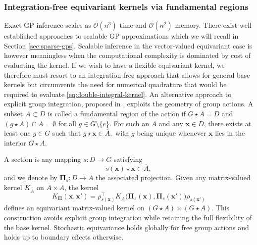 \documentclass[11pt,a4paper]{article}
\newcommand{\PiA}{\boldsymbol{\Pi}_s}
\newcommand{\Kpi}{K_{\boldsymbol{\Pi}}}
\newcommand{\sectionmap}{s}
\newcommand{\KA}{K_{\overline{A}}}
\begin{document}
\subsubsection{Integration-free equivariant kernels via fundamental regions}
Exact GP inference scales as $\mathcal{O}(n^3)$ time and $\mathcal{O}(n^2)$ memory. There exist well established approaches to scalable GP approximations which we will recall in Section \ref{sec:sparse-gps}. Scalable inference in the vector-valued equivariant case is however meaningless when the computational complexity is dominated by cost of evaluating the kernel. If we wish to have a flexible equivariant kernel, we therefore must resort to an integration-free approach that allows for general base kernels but circumvents the need for numerical quadrature that would be required to evaluate \eqref{eq:double-integral-kernel}. An alternative approach to explicit group integration, proposed in \citep{steinertintegration}, exploits the geometry of group actions. A subset $A\subset D$ is called a fundamental region of the action if $G\star \overline{A} = D$ and $(g\star A)\cap A=\emptyset$ for all $g\in G\setminus\{e\}$. For such an $A$ and any $\boldsymbol{x}\in D$, there exists at least one $g\in G$ such that $g\star\boldsymbol{x}\in\overline{A},$ with $g$ being unique whenever $\boldsymbol{x}$ lies in the interior $G\star A.$

A section is any mapping $s : D\to G$ satisfying
\begin{displaymath}s(\boldsymbol{x})\star\boldsymbol{x}\in\overline{A},\end{displaymath}
and we denote by $\PiA : D\to\overline{A}$ the associated projection.
Given any matrix-valued kernel $\KA$ on $\overline{A}\times\overline{A}$, the kernel
\begin{equation}\label{eq:fundamental region kernel} \Kpi(\boldsymbol{x}, \boldsymbol{x}') = \rho_{\sectionmap(\boldsymbol{x})}^{\top} \KA\bigl(\PiA(\boldsymbol{x}), \PiA(\boldsymbol{x}')\bigr) \rho_{\sectionmap(\boldsymbol{x'})}\end{equation}
defines an equivariant matrix-valued kernel on $(G\star A)\times(G\star A)$.
This construction avoids explicit group integration while retaining the full flexibility of the base kernel. Stochastic equivariance holds globally for free group actions and holds up to boundary effects otherwise.
\end{document}
